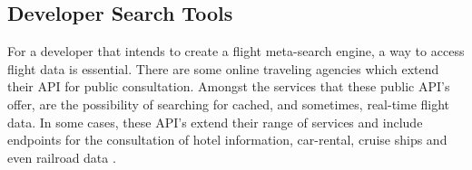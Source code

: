 

\subsection{Developer Search Tools}




For a developer that intends to create a flight meta-search engine, a way to access flight
data is essential. There are some online traveling agencies which extend their API for public
consultation. Amongst the services that these public API’s offer, are the possibility of searching
for cached, and sometimes, real-time flight data. In some cases, these API's extend their range of
services and include endpoints for the consultation of hotel information, car-rental, cruise ships
and even railroad data \cite{expedia_docs, skyscanner_docs}.

